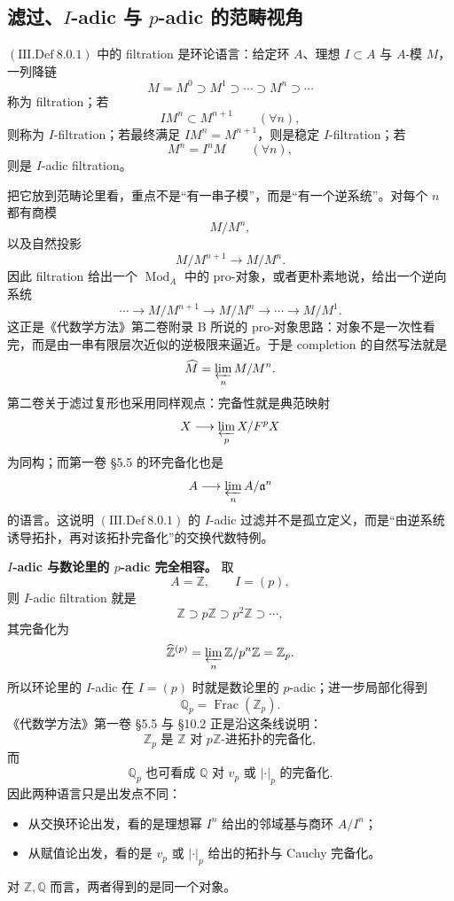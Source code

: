 \documentclass[a4paper]{ctexart}
\theoremstyle{definition}
\theoremstyle{analysis}
\theoremstyle{plain}
\begin{document}
\subsection{\texorpdfstring{滤过、\(I\)-adic 与 \(p\)-adic 的范畴视角}{滤过、I-adic 与 p-adic 的范畴视角}}\label{subsec:topic-filtration-adic}

\label{rem:filtration-pro}
\((\mathrm{III.Def}\ 8.0.1)\) 中的 filtration 是环论语言：给定环 \(A\)、理想 \(I\subset A\) 与 \(A\)-模 \(M\)，一列降链
\[
  M=M^0\supset M^1\supset \cdots \supset M^n\supset \cdots
\]
称为 filtration；若
\[
  IM^n\subset M^{n+1}\qquad (\forall n),
\]
则称为 \(I\)-filtration；若最终满足 \(IM^n=M^{n+1}\)，则是稳定 \(I\)-filtration；若
\[
  M^n=I^nM\qquad (\forall n),
\]
则是 \(I\)-adic filtration。

\medskip

把它放到范畴论里看，重点不是“有一串子模”，而是“有一个逆系统”。对每个 \(n\) 都有商模
\[
  M/M^n,
\]
以及自然投影
\[
  M/M^{n+1}\longrightarrow M/M^n.
\]
因此 filtration 给出一个 \(\operatorname{Mod}_A\) 中的 pro-对象，或者更朴素地说，给出一个逆向系统
\[
  \cdots \longrightarrow M/M^{n+1}\longrightarrow M/M^n\longrightarrow \cdots \longrightarrow M/M^1.
\]
这正是《代数学方法》第二卷附录 B 所说的 pro-对象思路：对象不是一次性看完，而是由一串有限层次近似的逆极限来逼近。于是 completion 的自然写法就是
\[
  \widehat M=\varprojlim_n M/M^n.
\]
第二卷关于滤过复形也采用同样观点：完备性就是典范映射
\[
  X\longrightarrow \varprojlim_p X/F^pX
\]
为同构；而第一卷 \S 5.5 的环完备化也是
\[
  A\longrightarrow \varprojlim_n A/\mathfrak a^n
\]
的语言。这说明 \((\mathrm{III.Def}\ 8.0.1)\) 的 \(I\)-adic 过滤并不是孤立定义，而是“由逆系统诱导拓扑，再对该拓扑完备化”的交换代数特例。

\medskip

\label{rem:iadic-padic}
\textbf{\(I\)-adic 与数论里的 \(p\)-adic 完全相容。} 取
\[
  A=\mathbb Z,\qquad I=(p),
\]
则 \(I\)-adic filtration 就是
\[
  \mathbb Z\supset p\mathbb Z\supset p^2\mathbb Z\supset \cdots,
\]
其完备化为
\[
  \widehat{\mathbb Z}^{(p)}
  =
  \varprojlim_n \mathbb Z/p^n\mathbb Z
  =\mathbb Z_p.
\]
所以环论里的 \(I\)-adic 在 \(I=(p)\) 时就是数论里的 \(p\)-adic；进一步局部化得到
\[
  \mathbb Q_p=\operatorname{Frac}(\mathbb Z_p).
\]
《代数学方法》第一卷 \S 5.5 与 \S 10.2 正是沿这条线说明：
\[
  \mathbb Z_p
  \text{ 是 } \mathbb Z \text{ 对 } p\mathbb Z\text{-进拓扑的完备化},
\]
而
\[
  \mathbb Q_p
  \text{ 也可看成 } \mathbb Q \text{ 对 } v_p \text{ 或 } |\cdot|_p \text{ 的完备化}.
\]
因此两种语言只是出发点不同：
\begin{itemize}
  \item 从交换环论出发，看的是理想幂 \(I^n\) 给出的邻域基与商环 \(A/I^n\)；
  \item 从赋值论出发，看的是 \(v_p\) 或 \(|\cdot|_p\) 给出的拓扑与 Cauchy 完备化。
\end{itemize}
对 \(\mathbb Z,\mathbb Q\) 而言，两者得到的是同一个对象。
\end{document}
